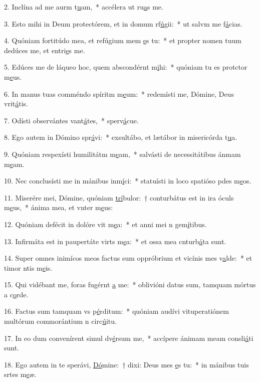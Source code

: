 2. Inclína ad me aurm t\uline{u}am,~* accélera ut ru\uline{a}s me.\par 
3. Esto mihi in Deum protectórem, et in domum rf\uline{ú}gii:~* ut salvm me f\uline{á}cias.\par 
4. Quóniam fortitúdo mea, et refúgium mem \uline{e}s tu:~* et propter nomen tuum dedúces me, et entri\uline{e}s me.\par 
5. Edúces me de láqueo hoc, quem abscondérnt m\uline{i}hi:~* quóniam tu es protctor m\uline{e}us.\par 
6. In manus tuas comméndo spíritm m\uline{e}um:~* redemísti me, Dómine, Deus vrit\uline{á}tis.\par 
7. Odísti observántes vant\uline{á}tes,~* sperv\uline{á}cue.\par 
8. Ego autem in Dómino spr\uline{á}vi:~* exsultábo, et lætábor in misericórda t\uline{u}a.\par 
9. Quóniam respexísti humilitátm m\uline{e}am,~* salvásti de necessitátibus ánmam m\uline{e}am.\par 
10. Nec conclusísti me in mánibus inm\uline{í}ci:~* statuísti in loco spatióso pdes m\uline{e}os.\par 
11. Miserére mei, Dómine, quóniam \uline{trí}bulor:~† conturbátus est in ira óculs m\uline{e}us,~* ánima mea, et vnter m\uline{e}us:\par 
12. Quóniam defécit in dolóre vit m\uline{e}a:~* et anni mei n gem\uline{í}tibus.\par 
13. Infirmáta est in paupertáte virts m\uline{e}a:~* et ossa mea cnturb\uline{á}ta sunt.\par 
14. Super omnes inimícos meos factus sum oppróbrium et vicínis mes v\uline{a}lde:~* et timor ntis m\uline{e}is.\par 
15. Qui vidébant me, foras fugérnt \uline{a} me:~* oblivióni datus sum, tamquam mórtus a c\uline{o}rde.\par 
16. Factus sum tamquam vs p\uline{é}rditum:~* quóniam audívi vituperatiónem multórum commorántium n circ\uline{ú}itu.\par 
17. In eo dum convenírent simul dv\uline{é}rsum me,~* accípere ánimam meam consli\uline{á}ti sunt.\par 
18. Ego autem in te sperávi, \uline{Dó}mine:~† dixi: Deus mes \uline{e}s tu:~* in mánibus tuis srtes m\uline{e}æ.\par 
